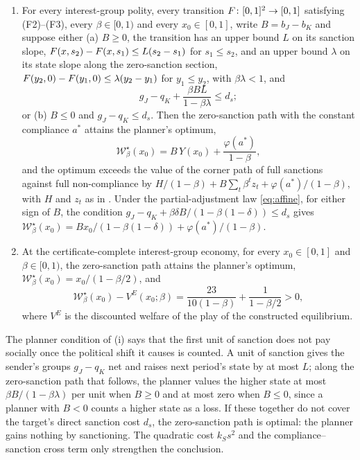 \begin{proposition}
\label{prop:planner-optimum-lower-bound}
\begin{enumerate}[label=(\roman*)]
\item For every interest-group polity, every transition
$F\colon[0,1]^2\to[0,1]$ satisfying \textup{(F2)--(F3)}, every
\(\beta\in[0,1)\) and every \(x_0\in[0,1]\), write $B=b_J-b_K$ and suppose
either (a) $B\ge0$, the transition has an upper bound $L$ on its sanction slope,
$F(x,s_2)-F(x,s_1)\le L(s_2-s_1)$ for $s_1\le s_2$, and an upper bound
$\lambda$ on its state slope along the zero-sanction section,
$F(y_2,0)-F(y_1,0)\le\lambda(y_2-y_1)$ for $y_1\le y_2$, with
$\beta\lambda<1$, and
\[
g_J-q_K+\frac{\beta BL}{1-\beta\lambda}\le d_s ;
\]
or (b) $B\le0$ and $g_J-q_K\le d_s$. Then the zero-sanction path with the
constant compliance $a^\ast$ attains the planner's optimum,
\[
\mathcal W^\star_\beta(x_0)=B\,Y(x_0)+\frac{\varphi(a^\ast)}{1-\beta},
\]
and the optimum exceeds the value of the corner path of full
sanctions against full non-compliance by
$H/(1-\beta)+B\sum_t\beta^tz_t+\varphi(a^\ast)/(1-\beta)$, with $H$ and $z_t$
as in . Under the partial-adjustment law \eqref{eq:affine},
for either sign of $B$, the condition
$g_J-q_K+\beta\delta B/(1-\beta(1-\delta))\le d_s$ gives
$\mathcal W^\star_\beta(x_0)=Bx_0/(1-\beta(1-\delta))+\varphi(a^\ast)/(1-\beta)$.
\item At the certificate-complete interest-group economy, for every
\(x_0\in[0,1]\) and \(\beta\in[0,1)\), the zero-sanction path attains the
planner's optimum, \(\mathcal W^\star_\beta(x_0)=x_0/(1-\beta/2)\), and
\[
\mathcal W^\star_\beta(x_0)-V^E(x_0;\beta)
=
\frac{23}{10(1-\beta)}+\frac{1}{1-\beta/2}
>0,
\]
where \(V^E\) is the discounted welfare of the play of the constructed
equilibrium.
\end{enumerate}
\end{proposition}

The planner condition of (i) says that the first unit of sanction does not pay socially once the
political shift it causes is counted. A unit of sanction gives the sender's
groups $g_J-q_K$ net and raises next period's state by at most $L$; along the
zero-sanction path that follows, the planner values the higher state at most
$\beta B/(1-\beta\lambda)$ per unit when $B\ge0$ and at most zero when
$B\le0$, since a planner with $B<0$ counts a higher state as a loss. If these
together do not cover the target's direct sanction cost $d_s$, the zero-sanction
path is optimal: the planner gains nothing by sanctioning. The quadratic cost
$k_Ss^2$ and the compliance--sanction cross term only strengthen the conclusion.

